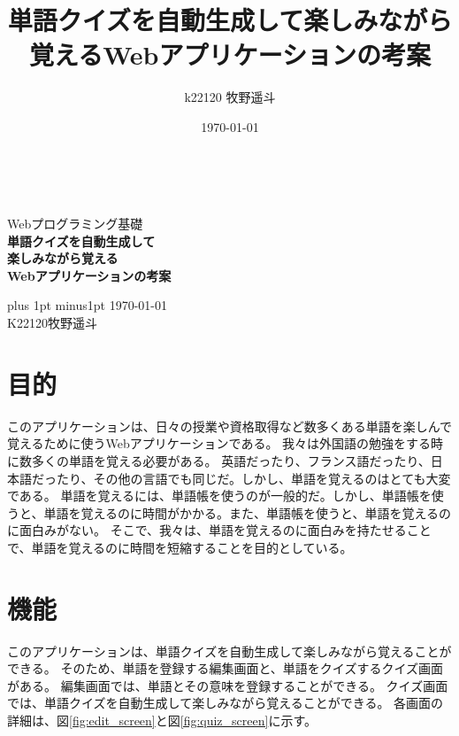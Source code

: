 \documentclass[11pt,a4paper]{jsarticle}
\title{単語クイズを自動生成して楽しみながら覚えるWebアプリケーションの考案}
\author{k22120 牧野遥斗}
\date{\today}
\begin{document}
\begin{titlepage}
    \begin{center}

        \ \vspace{19mm}

        \LARGE\baselineskip=13mm
        Webプログラミング基礎\\[1mm]
        {\Huge\baselineskip=13mm
        \textbf{単語クイズを自動生成して\\楽しみながら覚える\\Webアプリケーションの考案} \\
        }

        \vspace{80mm}

        \kanjiskip=9pt plus 1pt minus1pt
        \today \\
        K22120\hspace{1zw}牧野遥斗 \\
    \end{center}
\end{titlepage}

\section{目的}
このアプリケーションは、日々の授業や資格取得など数多くある単語を楽しんで覚えるために使うWebアプリケーションである。
我々は外国語の勉強をする時に数多くの単語を覚える必要がある。
英語だったり、フランス語だったり、日本語だったり、その他の言語でも同じだ。しかし、単語を覚えるのはとても大変である。
単語を覚えるには、単語帳を使うのが一般的だ。しかし、単語帳を使うと、単語を覚えるのに時間がかかる。また、単語帳を使うと、単語を覚えるのに面白みがない。
そこで、我々は、単語を覚えるのに面白みを持たせることで、単語を覚えるのに時間を短縮することを目的としている。

\section{機能}
このアプリケーションは、単語クイズを自動生成して楽しみながら覚えることができる。
そのため、単語を登録する編集画面と、単語をクイズするクイズ画面がある。
編集画面では、単語とその意味を登録することができる。
クイズ画面では、単語クイズを自動生成して楽しみながら覚えることができる。
各画面の詳細は、図\ref{fig:edit_screen}と図\ref{fig:quiz_screen}に示す。
\end{document}
